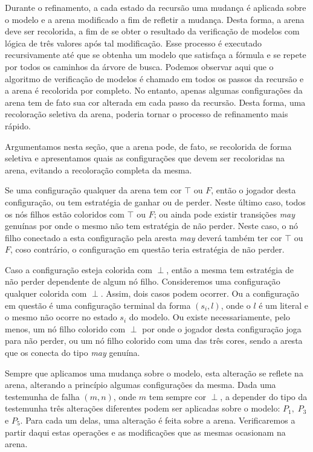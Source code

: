 \documentclass[normaltoc,capchap,capsec,times]{abnt}
\begin{document}
Durante o refinamento, a  cada estado da recursão uma mudança é aplicada sobre o modelo e  a arena modificado a fim de refletir a mudança. Desta forma, a arena deve ser recolorida, a fim de se obter o resultado da verificação de modelos com lógica de três valores após tal modificação. Esse processo é executado recursivamente até que se obtenha um modelo que satisfaça a fórmula e se repete por todos os caminhos da árvore de busca. Podemos observar aqui que o algoritmo de verificação de modelos é chamado em todos os passos da recursão e a arena é recolorida por completo. No entanto, apenas algumas configurações da arena tem de fato sua cor alterada em cada passo da recursão. Desta forma, uma recoloração seletiva da arena, poderia tornar o processo de refinamento mais rápido.

Argumentamos nesta seção, que a arena pode, de fato, se recolorida de forma seletiva e apresentamos quais as configurações que devem ser recoloridas na arena, evitando a recoloração completa da mesma. 

Se uma configuração qualquer da arena tem cor $\top$ ou $F$, então o jogador desta configuração, ou tem estratégia de ganhar ou de perder. Neste último caso, todos os nós filhos estão coloridos com $\top$ ou $F$; ou ainda pode existir transições \textit{may} genuínas por onde o mesmo não tem estratégia de não perder. Neste caso, o nó filho conectado a esta configuração pela aresta \textit{may} deverá também ter cor $\top$ ou $F$, coso contrário, o configuração em questão teria estratégia de não perder. 

Caso a configuração esteja colorida com $\perp$, então a mesma tem estratégia de não perder dependente de algum nó filho. Consideremos uma configuração qualquer colorida com $\perp$. Assim, dois casos podem ocorrer. Ou a configuração em questão é uma configuração terminal da forma $(s_i,l)$, onde o $l$ é um literal e o mesmo não ocorre no estado $s_i$ do modelo. Ou existe necessariamente, pelo menos, um nó filho colorido com $\perp$ por onde o jogador desta configuração joga para não perder, ou um nó filho colorido com uma das três cores, sendo a aresta que os conecta do tipo \textit{may} genuína. 

Sempre que aplicamos uma mudança sobre o modelo, esta alteração se reflete na arena, alterando a princípio algumas configurações da mesma. Dada uma testemunha de falha $(m,n)$, onde $m$ tem sempre cor $\perp$, a depender do tipo da testemunha três alterações diferentes podem ser aplicadas sobre o modelo: $P_1, \; P_3$ e $P_5$. Para cada um delas, uma alteração é feita sobre a arena. Verificaremos a partir daqui estas operações e as modificações que as mesmas ocasionam na arena.
\end{document}
